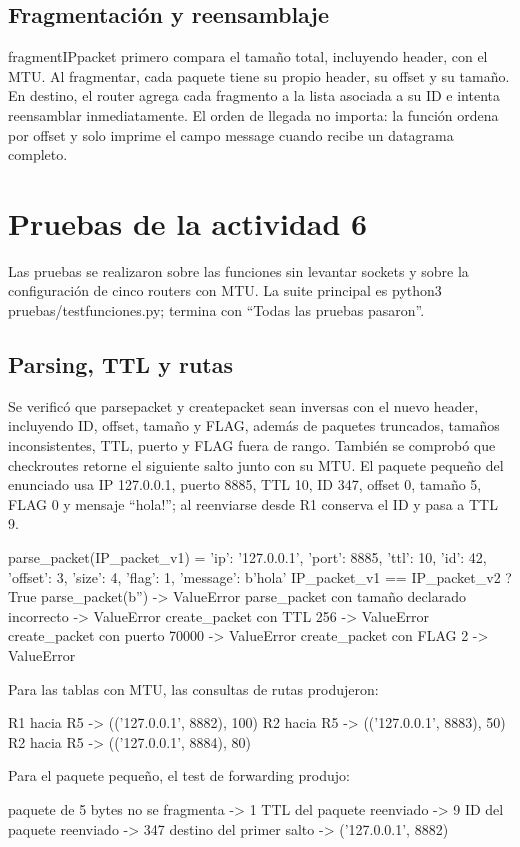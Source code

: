 \documentclass[
	spanish, %
	letterpaper, oneside
]{article}
\newcommand{\codeunderscore}{\textunderscore\allowbreak}
\newcommand{\code}[1]{{\let\_\codeunderscore#1}}     %
\newcommand{\field}[1]{#1}    %
\begin{document}
\subsection{Fragmentación y reensamblaje}
\code{fragment\_IP\_packet} primero compara el tamaño total, incluyendo header, con el MTU. Al fragmentar, cada paquete tiene su propio header, su offset y su tamaño. En destino, el router agrega cada fragmento a la lista asociada a su ID e intenta reensamblar inmediatamente. El orden de llegada no importa: la función ordena por offset y solo imprime el campo \field{message} cuando recibe un datagrama completo.

\section{Pruebas de la actividad 6}
Las pruebas se realizaron sobre las funciones sin levantar sockets y sobre la configuración de cinco routers con MTU. La suite principal es \code{python3 pruebas/test\_funciones.py}; termina con ``Todas las pruebas pasaron''.

\subsection{Parsing, TTL y rutas}
Se verificó que \code{parse\_packet} y \code{create\_packet} sean inversas con el nuevo header, incluyendo ID, offset, tamaño y FLAG, además de paquetes truncados, tamaños inconsistentes, TTL, puerto y FLAG fuera de rango. También se comprobó que \code{check\_routes} retorne el siguiente salto junto con su MTU. El paquete pequeño del enunciado usa IP 127.0.0.1, puerto 8885, TTL 10, ID 347, offset 0, tamaño 5, FLAG 0 y mensaje ``hola!''; al reenviarse desde R1 conserva el ID y pasa a TTL 9.
\begin{salida}
parse_packet(IP_packet_v1) =
{'ip': '127.0.0.1', 'port': 8885, 'ttl': 10, 'id': 42,
 'offset': 3, 'size': 4, 'flag': 1, 'message': b'hola'}
IP_packet_v1 == IP_packet_v2 ? True
parse_packet(b'') -> ValueError
parse_packet con tamaño declarado incorrecto -> ValueError
create_packet con TTL 256 -> ValueError
create_packet con puerto 70000 -> ValueError
create_packet con FLAG 2 -> ValueError
\end{salida}
Para las tablas con MTU, las consultas de rutas produjeron:
\begin{salida}
R1 hacia R5 -> (('127.0.0.1', 8882), 100)
R2 hacia R5 -> (('127.0.0.1', 8883), 50)
R2 hacia R5 -> (('127.0.0.1', 8884), 80)
\end{salida}
Para el paquete pequeño, el test de forwarding produjo:
\begin{salida}
paquete de 5 bytes no se fragmenta -> 1
TTL del paquete reenviado -> 9
ID del paquete reenviado -> 347
destino del primer salto -> ('127.0.0.1', 8882)
\end{salida}
\end{document}
